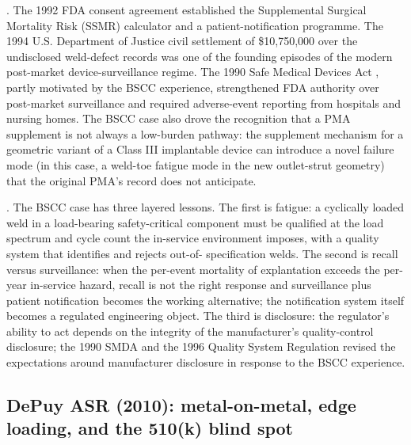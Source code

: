 . The 1992 FDA consent agreement
established the Supplemental Surgical Mortality Risk (SSMR)
calculator and a patient-notification programme. The 1994 U.S.
Department of Justice civil settlement of \$10{,}750{,}000 over
the undisclosed weld-defect records
\cite{web:v6c12-doj-shiley-1994-settlement} was one of the
founding episodes of the modern post-market device-surveillance
regime. The 1990 Safe Medical Devices Act
\cite{law:v6c12-safe-medical-devices-act-1990}, partly motivated
by the BSCC experience, strengthened FDA authority over post-market
surveillance and required adverse-event reporting from hospitals
and nursing homes. The BSCC case also drove the recognition that a
PMA supplement is not always a low-burden pathway: the supplement
mechanism for a geometric variant of a Class III implantable device
can introduce a novel failure mode (in this case, a weld-toe
fatigue mode in the new outlet-strut geometry) that the original
PMA's record does not anticipate.

. The BSCC case has three layered
lessons. The first is fatigue: a cyclically loaded weld in a
load-bearing safety-critical component must be qualified at the
load spectrum and cycle count the in-service environment imposes,
with a quality system that identifies and rejects out-of-
specification welds. The second is recall versus surveillance:
when the per-event mortality of explantation exceeds the per-year
in-service hazard, recall is not the right response and surveillance
plus patient notification becomes the working alternative; the
notification system itself becomes a regulated engineering object.
The third is disclosure: the regulator's ability to act depends on
the integrity of the manufacturer's quality-control disclosure;
the 1990 SMDA and the 1996 Quality System Regulation revised the
expectations around manufacturer disclosure in response to the
BSCC experience.

\subsection{DePuy ASR (2010): metal-on-metal, edge loading, and the 510(k) blind spot}

